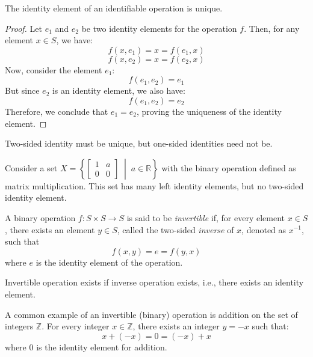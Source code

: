 \documentclass[
	11pt, %
	fleqn, %
	a4paper, %
]{LegrandOrangeBook}
\begin{document}
\begin{proposition}
    The identity element of an identifiable operation is unique.
\end{proposition}

\begin{proof}
    Let $e_1$ and $e_2$ be two identity elements for the operation $f$. Then, for any element $x \in S$, we have:
    \[ f(x,e_1) = x = f(e_1,x) \]
    \[ f(x,e_2) = x = f(e_2,x) \]
    Now, consider the element $e_1$:
    \[ f(e_1,e_2) = e_1 \]
    But since $e_2$ is an identity element, we also have:
    \[ f(e_1,e_2) = e_2 \]
    Therefore, we conclude that $e_1 = e_2$, proving the uniqueness of the identity element.
\end{proof}

\begin{remark}
    Two-sided identity must be unique, but one-sided identities need not be.
\end{remark}

\begin{example}
    Consider a set $X = \left\{ \begin{bmatrix}
        1 & a \\
        0 & 0 
    \end{bmatrix} \; \middle| \; a \in \mathbb{R} \right\}$ with the binary operation defined as matrix multiplication. This set has many left identity elements, but no two-sided identity element.
\end{example}

\begin{definition}
    A binary operation $f: S \times S \to S$ is said to be \emph{invertible} if, for every element $x \in S$, there exists an element $y \in S$, called the two-sided \emph{inverse} of $x$, denoted as $x^{-1}$, such that
    \[ f(x,y) = e = f(y,x) \]
    where $e$ is the identity element of the operation.
\end{definition}

\begin{remark}
    Invertible operation exists if inverse operation exists, i.e., there exists an identity element.
\end{remark}

\begin{example}
    A common example of an invertible (binary) operation is addition on the set of integers $\mathbb{Z}$. For every integer $x \in \mathbb{Z}$, there exists an integer $y = -x$ such that:
    \begin{equation}
        x + (-x) = 0 = (-x) + x
    \end{equation}
    where $0$ is the identity element for addition.
\end{example}
\end{document}
